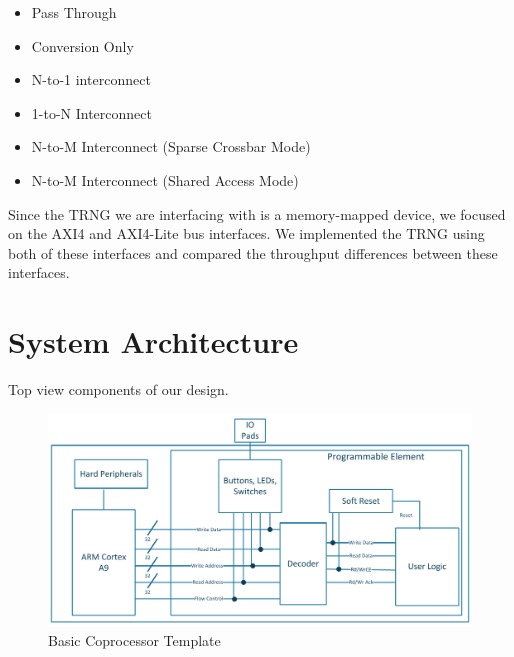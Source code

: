 \documentclass[journal]{IEEEtran}
\begin{document}
	\begin{itemize}
	
		\item Pass Through
		
		\item Conversion Only
		
		\item N-to-1 interconnect
		
		\item 1-to-N Interconnect
		
		\item N-to-M Interconnect (Sparse Crossbar Mode)
		
		\item N-to-M Interconnect (Shared Access Mode) \\

	\end{itemize} 

Since the TRNG we are interfacing with is a memory-mapped device, we focused on the AXI4 and AXI4-Lite bus interfaces. We implemented the TRNG using both of these interfaces and compared the throughput differences between these interfaces.

\section{System Architecture}

Top view components of our design.

\begin{figure}[!th]
\centering
\includegraphics[scale=.35]{Images/coprocessor-template.pdf}
\caption{ Basic Coprocessor Template}
\label{fig:template}
\end{figure} 
\end{document}
